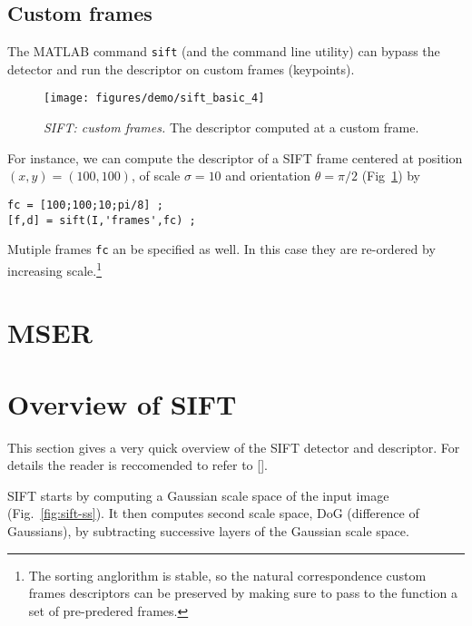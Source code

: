 \documentclass{article}
\begin{document}
\subsection{Custom frames}\label{sift.custom}

The MATLAB command \verb$sift$ (and the command line utility) can
bypass the detector and run the descriptor on custom frames
(keypoints).
\begin{figure}
\begin{center}
\texttt{[image: figures/demo/sift\_basic\_4]}
\end{center}
\caption{{\em SIFT: custom frames.} The descriptor computed at a
  custom frame.}
\label{fig:sift-custom}
\end{figure}
For instance, we can compute the descriptor of a SIFT frame centered
at position $(x,y)=(100,100)$, of scale $\sigma=10$ and orientation
$\theta=\pi/2$ (Fig~\ref{fig:sift-custom}) by
\begin{verbatim}
fc = [100;100;10;pi/8] ;
[f,d] = sift(I,'frames',fc) ;
\end{verbatim}
Mutiple frames \verb$fc$ an be specified as well. In this case they
are re-ordered by increasing scale.\footnote{The sorting anglorithm is
  stable, so the natural correspondence custom frames descriptors can
  be preserved by making sure to pass to the function a set of
  pre-predered frames.}


\section{MSER}\label{mser}


\appendix
\section{Overview of SIFT}\label{sift.overview}

This section gives a very quick overview of the SIFT detector and
descriptor. For details the reader is reccomended to refer to [].

 SIFT starts by computing a
Gaussian scale space of the input image (Fig.~\ref{fig:sift-ss}). It
then computes second scale space, DoG (difference of Gaussians), by
subtracting successive layers of the Gaussian scale space.
\end{document}
